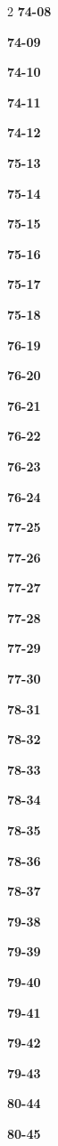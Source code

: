 \documentclass[10pt,a4paper]{article}
\begin{document}
\begin{multicols}{2}
\noindent\textbf{74-08}\ \par
\noindent\textbf{74-09}\ \par
\noindent\textbf{74-10}\ \par
\noindent\textbf{74-11}\ \par
\noindent\textbf{74-12}\ \par
\noindent\textbf{75-13}\ \par
\noindent\textbf{75-14}\ \par
\noindent\textbf{75-15}\ \par
\noindent\textbf{75-16}\ \par
\noindent\textbf{75-17}\ \par
\noindent\textbf{75-18}\ \par
\noindent\textbf{76-19}\ \par
\noindent\textbf{76-20}\ \par
\noindent\textbf{76-21}\ \par
\noindent\textbf{76-22}\ \par
\noindent\textbf{76-23}\ \par
\noindent\textbf{76-24}\ \par
\noindent\textbf{77-25}\ \par
\noindent\textbf{77-26}\ \par
\noindent\textbf{77-27}\ \par
\noindent\textbf{77-28}\ \par
\noindent\textbf{77-29}\ \par
\noindent\textbf{77-30}\ \par
\noindent\textbf{78-31}\ \par
\noindent\textbf{78-32}\ \par
\noindent\textbf{78-33}\ \par
\noindent\textbf{78-34}\ \par
\noindent\textbf{78-35}\ \par
\noindent\textbf{78-36}\ \par
\noindent\textbf{78-37}\ \par
\noindent\textbf{79-38}\ \par
\noindent\textbf{79-39}\ \par
\noindent\textbf{79-40}\ \par
\noindent\textbf{79-41}\ \par
\noindent\textbf{79-42}\ \par
\noindent\textbf{79-43}\ \par
\noindent\textbf{80-44}\ \par
\noindent\textbf{80-45}\ \par

\end{multicols}
\end{document}
